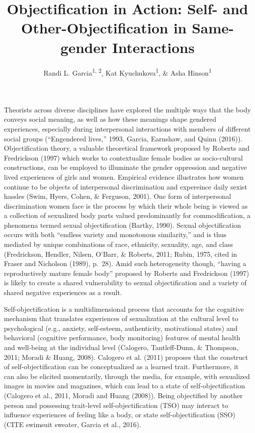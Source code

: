 \documentclass[man]{apa6}
\title{Objectification in Action: Self- and Other-Objectification in
Same-gender Interactions}
\author{Randi L. Garcia\textsuperscript{1, 2}, Kat
Kyuchukova\textsuperscript{1}, \& Asha Hinson\textsuperscript{1}}
\date{}
\affiliation{
\vspace{0.5cm}
\textsuperscript{1} Department of Psychology, Smith College\\\textsuperscript{2} Program in Statistical and Data Sciences, Smith College}
\begin{document}
\maketitle

Theorists across diverse disciplines have explored the multiple ways
that the body conveys social meaning, as well as how these meanings
shape gendered experiences, especially during interpersonal interactions
with members of different social groups (``Engendered lives,'' 1993,
Garcia, Earnshaw, and Quinn (2016)). Objectification theory, a valuable
theoretical framework proposed by Roberts and Fredrickson (1997) which
works to contextualize female bodies as socio-cultural constructions,
can be employed to illuminate the gender oppression and negative lived
experiences of girls and women. Empirical evidence illustrates how women
continue to be objects of interpersonal discrimination and expereince
daily sexist hassles (Swim, Hyers, Cohen, \& Ferguson, 2001). One form
of interpersonal discrimination women face is the process by which their
whole being is viewed as a collection of sexualized body parts valued
predominantly for commodification, a phenomena termed sexual
objectification (Bartky, 1990). Sexual objectification occurs with both
\enquote{endless variety and monotonous similarity,} and is thus
mediated by unique combinations of race, ethnicity, sexuality, age, and
class (Fredrickson, Hendler, Nilsen, O'Barr, \& Roberts, 2011; Rubin,
1975, cited in Fraser and Nicholson (1989), p.~28). Amid such
heterogeneity though, \enquote{having a reproductively mature female
body} proposed by Roberts and Fredrickson (1997) is likely to create a
shared vulnerability to sexual objectification and a variety of shared
negative experiences as a result.

Self-objectification is a multidimensional process that accounts for the
cognitive mechanism that translates experiences of sexualization at the
cultural level to psychological (e.g., anxiety, self-esteem,
authenticity, motivational states) and behavioral (cognitive
performance, body monitoring) features of mental health and well-being
at the individual level (Calogero, Tantleff-Dunn, \& Thompson, 2011;
Moradi \& Huang, 2008). Calogero et al. (2011) proposes that the
construct of self-objectification can be conceptualized as a learned
trait. Furthermore, it can also be elicited momentarily, through the
media, for example, with sexualized images in movies and magazines,
which can lead to a state of self-objectification (Calogero et al.,
2011, Moradi and Huang (2008)). Being objectified by another person and
possessing trait-level self-objectification (TSO) may interact to
influence experiences of feeling like a body, or state
self-objectification (SSO) (CITE swimsuit sweater, Garcia et al., 2016).
\end{document}
